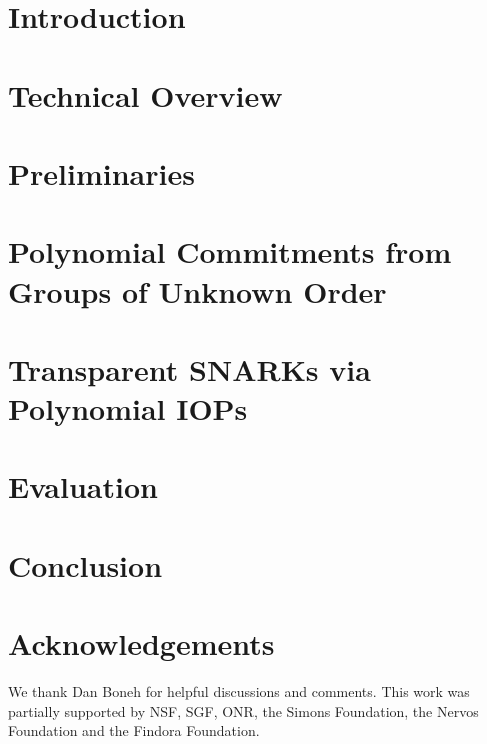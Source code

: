 \documentclass[12pt]{article}
\theoremstyle{definition}
\begin{document}
\section{Introduction}
 
\section{Technical Overview}\label{sec:overview} 

\section{Preliminaries}


\section{Polynomial Commitments from Groups of Unknown Order}
\label{sec:protocol}


\section{Transparent SNARKs via Polynomial IOPs}\label{sec:polyiop}


\section{Evaluation}


\section{Conclusion}

\section*{Acknowledgements}
We thank Dan Boneh for helpful discussions and comments.
This work was partially supported by NSF, SGF, ONR, the Simons Foundation, the Nervos Foundation and the Findora Foundation. 

{\footnotesize
  }

\appendix

 
\end{document}
